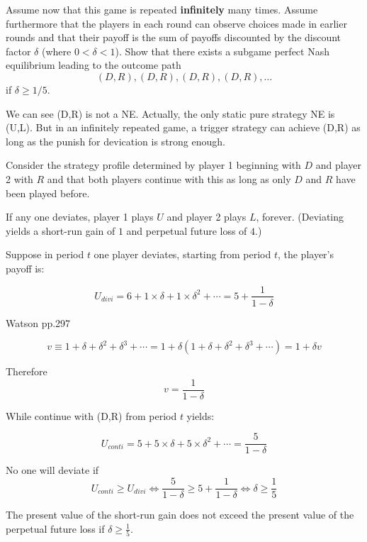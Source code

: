 \documentclass{article}
\begin{document}
Assume now that this game is repeated \textbf{infinitely} many times. Assume furthermore that the players in each round can observe choices made in earlier rounds and that their payoff is the sum of payoffs discounted by the discount factor   $\delta$ (where $0 < \delta < 1$). Show that there exists a subgame perfect Nash equilibrium leading to the outcome path
$$(D, R), (D, R), (D, R), (D, R), \dots $$
if $\delta \geq 1/5$. 

\bigskip

\begin{mdframed}[backgroundcolor=blue!20,linecolor=white]
We can see (D,R) is not a NE. Actually, the only static pure strategy NE is (U,L). But in an infinitely repeated game, a trigger strategy can achieve (D,R) as long as the punish for devication is strong enough.
\end{mdframed}

Consider the strategy profile determined by player 1 beginning with $D$ and player 2 with $R$ and that both players continue with this as long as only $D$ and $R$ have been played before. 

\medskip

If any one deviates, player 1 plays $U$ and player 2 plays $L$, forever.
(Deviating yields a short-run gain of $1$ and perpetual future loss of $4$.) 

\medskip

Suppose in period $t$ one player deviates, starting from period $t$, the player's payoff is:

$$U_{divi} = 6 + 1\times \delta + 1\times \delta^2 + \cdots = 5 + \frac{1}{1-\delta}$$

\begin{mdframed}[backgroundcolor=blue!20,linecolor=white]
Watson pp.297

$$v \equiv 1 + \delta + \delta^2 + \delta^3 + \cdots = 1 + \delta ( 1 + \delta +\delta^2 + \delta^3 + \cdots) = 1 + \delta v$$

Therefore $$v= \frac{1}{1-\delta}$$
\end{mdframed}

While continue with (D,R) from period $t$ yields:

$$U_{conti} = 5 + 5\times \delta + 5\times \delta^2 + \cdots = \frac{5}{1-\delta}$$

No one will deviate if $$U_{conti} \ge U_{divi} \iff \frac{5}{1-\delta} \ge 5 + \frac{1}{1-\delta} \iff  \delta \ge \frac{1}{5} $$



The present value of the short-run gain does not exceed the present value of the perpetual future loss if $\delta \geq \tfrac15$.
\end{document}

